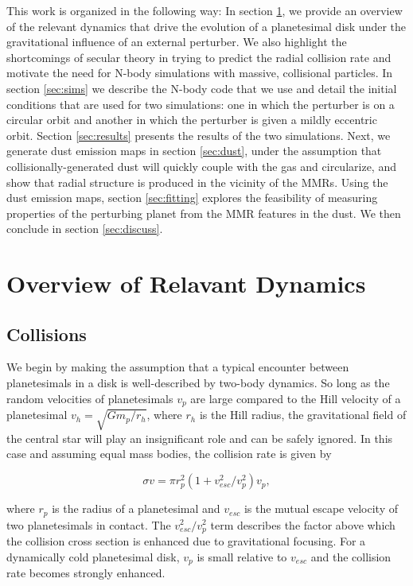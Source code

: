 \documentclass[twocolumn]{aastex63}
\begin{document}
This work is organized in the following way: In section \ref{sec:dynamics}, we provide an overview of the relevant dynamics that drive 
the evolution of a planetesimal disk under the gravitational influence of an external perturber. We also highlight the shortcomings of secular theory in trying to predict the radial collision rate and motivate the need for N-body simulations with massive, collisional particles. In section \ref{sec:sims} we describe the N-body code that we use and detail the initial conditions that are used for two simulations: one in which the perturber is on a circular orbit and another in which the perturber is given a mildly eccentric orbit. Section \ref{sec:results} presents the results of the two simulations. Next, we generate dust emission maps in section \ref{sec:dust}, under the assumption that collisionally-generated dust will quickly couple with the gas and circularize, and show that radial structure is produced in the vicinity of the MMRs. Using the dust emission maps, section \ref{sec:fitting} explores the feasibility of measuring properties of the perturbing planet from the MMR features in the dust. We then conclude in section \ref{sec:discuss}. 

\section{Overview of Relavant Dynamics} \label{sec:dynamics}

\subsection{Collisions}

We begin by making the assumption that a typical encounter between planetesimals in a disk is well-described by two-body 
dynamics. So long as the random velocities of planetesimals $v_{p}$ are large compared to the Hill velocity of a planetesimal $v_{h} 
= \sqrt{G m_{p} / r_{h}}$, where $r_{h}$ is the Hill radius, the gravitational field of the central star will play an insignificant role and 
can be safely ignored. In this case and assuming equal mass bodies, the collision rate is given by \citep{1967SvA....10..650S}

\begin{equation}\label{eq:safronov}
	\sigma v = \pi r_{p}^2 \left( 1 + v_{esc}^2/v_{p}^2 \right) v_{p},
\end{equation}

\noindent where $r_{p}$ is the radius of a planetesimal and $v_{esc}$ is the mutual escape velocity of two planetesimals in contact. 
The $v_{esc}^2/v_{p}^2$ term describes the factor above which the collision cross section is enhanced due to gravitational focusing. 
For a dynamically cold planetesimal disk, $v_{p}$ is small relative to $v_{esc}$ and the collision rate becomes strongly enhanced.
\end{document}
